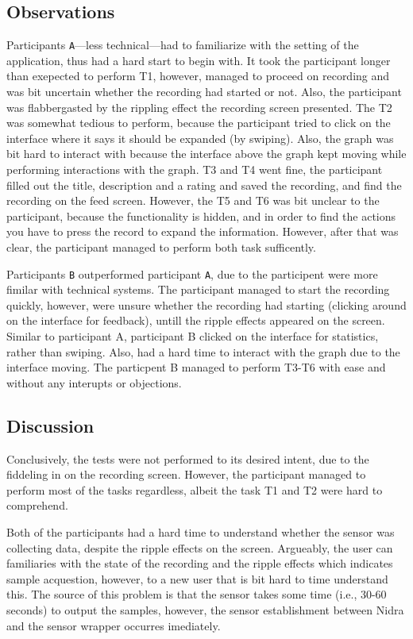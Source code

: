 \subsection{Observations}
Participants \verb|A|---less technical---had to familiarize with the setting of the application, thus had a hard start to begin with. It took the participant longer than exepected to perform T1, however, managed to proceed on recording and was bit uncertain whether the recording had started or not. Also, the participant was flabbergasted by the rippling effect the recording screen presented. The T2 was somewhat tedious to perform, because the participant tried to click on the interface where it says it should be expanded (by swiping). Also, the graph was bit hard to interact with because the interface above the graph kept moving while performing interactions with the graph. T3 and T4 went fine, the participant filled out the title, description and a rating and saved the recording, and find the recording on the feed screen. However, the T5 and T6 was bit unclear to the participant, because the functionality is hidden, and in order to find the actions you have to press the record to expand the information. However, after that was clear, the participant managed to perform both task sufficently. 

Participants \verb|B| outperformed participant \verb|A|, due to the participent were more fimilar with technical systems. The participant managed to start the recording quickly, however, were unsure whether the recording had starting (clicking around on the interface for feedback), untill the ripple effects appeared on the screen. Similar to participant A, participant B clicked on the interface for statistics, rather than swiping. Also, had a hard time to interact with the graph due to the interface moving. The particpent B managed to perform T3-T6 with ease and without any interupts or objections. 


\subsection{Discussion}

Conclusively, the tests were not performed to its desired intent, due to the fiddeling in on the recording screen. However, the participant managed to perform most of the tasks regardless, albeit the task T1 and T2 were hard to comprehend. 

Both of the participants had a hard time to understand whether the sensor was collecting data, despite the ripple effects on the screen. Argueably, the user can familiaries with the state of the recording and the ripple effects which indicates sample acquestion, however, to a new user that is bit hard to time understand this. The source of this problem is that the sensor takes some time (i.e., 30-60 seconds) to output the samples, however, the sensor establishment between Nidra and the sensor wrapper occurres imediately. 

